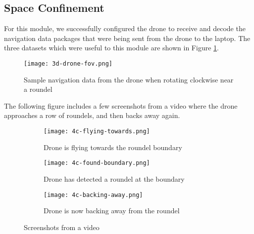 \subsection{Space Confinement}

For this module, we successfully configured the drone to receive and decode the navigation data packages that were being sent from the drone to the laptop. The three datasets which were useful to this module are shown in Figure \ref{fig:4c-sample-nav}.

\begin{figure}[H]
      \centering
      \texttt{[image: 3d-drone-fov.png]}
      \caption{Sample navigation data from the drone when rotating clockwise near a roundel}
      \label{fig:4c-sample-nav}
\end{figure}

The following figure includes a few screenshots from a video where the drone approaches a row of roundels, and then backs away again.

\onecolumn
\begin{figure}
        \begin{subfigure}[b]{0.25\textwidth}
                \texttt{[image: 4c-flying-towards.png]}
                \caption{Drone is flying towards the roundel boundary}
        \end{subfigure}%
        \hspace{\fill}
        \begin{subfigure}[b]{0.25\textwidth}
                \texttt{[image: 4c-found-boundary.png]}
                \caption{Drone has detected a roundel at the boundary}
        \end{subfigure}%
        \hspace{\fill}
        \begin{subfigure}[b]{0.25\textwidth}
                \texttt{[image: 4c-backing-away.png]}
                \caption{Drone is now backing away from the roundel}
        \end{subfigure}
        \caption{Screenshots from a video}\label{fig:4c-video}
\end{figure}
\twocolumn